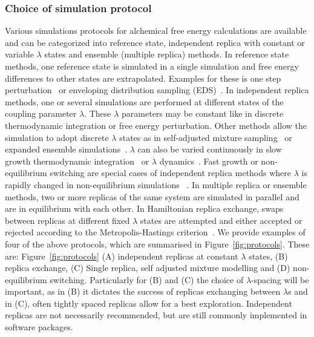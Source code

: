 \documentclass[9pt,bestpractices]{livecoms}
\begin{document}
\subsubsection{Choice of simulation protocol}
Various simulations protocols for alchemical free energy calculations are available and can be categorized into reference state, independent replica with constant or variable $\lambda$ states and ensemble (multiple replica) methods.
%
In reference state methods, one reference state is simulated in a single simulation and free energy differences to other states are extrapolated. Examples for these is one step perturbation~\cite{zwanzigHighTemperatureEquation1954,liu_estimating_1996,raman_sitespecific_2012,raman_estimation_2017,boresch_convergence_2017} or enveloping distribution sampling (EDS)~\cite{christ_enveloping_2007, christ_multiple_2008,christ_comparison_2009,sidler_efficient_2017,perthold_accelerated_2018}.
%
In independent replica methods, one or several simulations are performed at different states of the coupling parameter $\lambda$. These $\lambda$ parameters may be constant like in discrete thermodynamic integration\cite{kirkwoodQuantumStatisticsAlmost1933,kirkwoodQuantumStatisticsAlmost1934,kirkwoodStatisticalMechanicsFluid1935} or free energy perturbation\cite{jorgensen_perspective_2008}. Other methods allow the simulation to adopt discrete $\lambda$ states as in self-adjusted mixture sampling~\cite{tan_optimally_2017} or expanded ensemble simulations~\cite{lyubartsev_new_1992,lyubartsev_free_1994,lyubartsev_determination_1996,escobedo_optimized_2007,escobedo_optimized_2007a}. $\lambda$ can also be varied continuously in slow growth thermodynamic integration~\cite{straatsma_free_1986} or $\lambda$ dynamics~\cite{kong_dynamics_1996,guo_application_2003,knight_ldynamics_2009,knight_multisite_2011,donnini_constant_2011,armacost_biasing_2015,hayes_adaptive_2017}. Fast growth or non-equilibrium switching are special cases of independent replica methods where $\lambda$ is rapidly changed in non-equilibrium simulations ~\cite{jarzynski_nonequilibrium_1997,crooks_pathensemble_2000,hendrix_fast_2001,hummer_fastgrowth_2002}.
%
In multiple replica or ensemble methods, two or more replicas of the same system are simulated in parallel and are in equilibrium with each other. In Hamiltonian replica exchange, swaps between replicas at different fixed $\lambda$ states are attempted and either accepted or rejected according to the Metropolis-Hastings criterion~\cite{sugita_replicaexchange_1999,fukunishi_hamiltonian_2002,zhang_simulating_2016}.
%
We provide examples of four of the above protocols, which are summarised in Figure~\ref{fig:protocols}. These are: Figure~\ref{fig:protocols} (A) independent replicas at constant $\lambda$ states, (B) replica exchange, (C) Single replica, self adjusted mixture modelling and (D) non-equilibrium switching. Particularly for (B) and (C) the choice of $\lambda$-spacing will be important, as in (B) it dictates the success of replicas exchanging between $\lambda$s and in (C), often tightly spaced replicas allow for a best exploration. Independent replicas are not necessarily recommended, but are still commonly implemented in software packages. 
\end{document}
